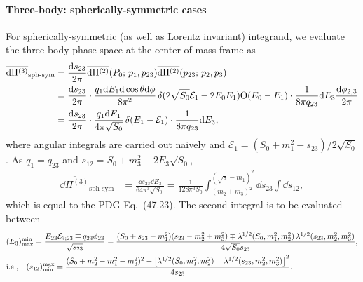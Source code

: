 \documentclass[CheatSheet]{subfiles}
\begin{document}
\paragraph{Three-body: spherically-symmetric cases}
For spherically-symmetric (as well as Lorentz invariant) integrand, we evaluate the three-body phase space at the center-of-mass frame as
\begin{align}
  \overline{\dd\Pi^{(3)}}_{\text{sph-sym}}
  &=\frac{\dd s_{23}}{2\pi}
  \overline{\dd\Pi^{(2)}}(P_0;\,p_1,p_{23})
  \overline{\dd\Pi^{(2)}}(p_{23};\,p_2,p_3)
\\
  &=\frac{\dd s_{23}}{2\pi}\cdot
   \frac{q_1\dd E_1\dd\cos\theta\dd\phi}{8\pi^2}
  \diracdelta(2\sqrt{S_0}\mathcal E_1-2E_0E_1)\Theta(E_0-E_1)\cdot
  \frac{1}{8\pi q_{23}}\dd E_3\frac{\dd\phi_{2,3}}{2\pi}
\\
  &=\frac{\dd s_{23}}{2\pi}\cdot
   \frac{q_1\dd E_1}{4\pi \sqrt{S_0}}
  \diracdelta(E_1-\mathcal E_1)\cdot
  \frac{1}{8\pi q_{23}}\dd E_3,
\end{align}
where angular integrals are carried out naively and $\mathcal E_1=(S_0+m_1^2-s_{23})/2\sqrt{S_0}$. As $q_1=q_{23}$ and $s_{12}=S_0+m_3^2-2E_3\sqrt{S_0}$,
\begin{align}
  \overline{\dd\Pi^{(3)}}_{\text{sph-sym}}
  &=\frac{\dd s_{23}\dd E_3}{64\pi^3\sqrt{S_0}}
  =\frac{1}{128\pi^3S_0}
\int_{(m_2+m_3)^2}^{(\sqrt{s}-m_1)^2}\dd s_{23}\int\dd s_{12},
\end{align}
which is equal to the PDG-Eq.~(47.23)\cite{PDG2018}. The second integral is to be evaluated between
\begin{align}
&(E_3)_{\text{max}}^{\text{min}} =
\frac{E_{23}\mathcal E_{3;23}\mp q_{23}\phi_{23}}{\sqrt{s_{23}}}
=
\frac{(S_0+s_{23}-m_1^2)(s_{23}-m_2^2+m_3^2)\mp\Kallen[1/2](S_0,m_1^2,m_2^2) \Kallen[1/2](s_{23},m_2^2,m_3^2)}{4\sqrt{S_0}s_{23}},
\\&\text{i.e.,}\quad
(s_{12})_{\text{min}}^{\text{max}} =
\frac{(S_0+m_2^2-m_1^2-m_3^2)^2-\left[
\Kallen[1/2](S_0,m_1^2,m_2^2) \mp \Kallen[1/2](s_{23},m_2^2,m_3^2)
\right]^2}{4s_{23}}.
\end{align}
\end{document}
